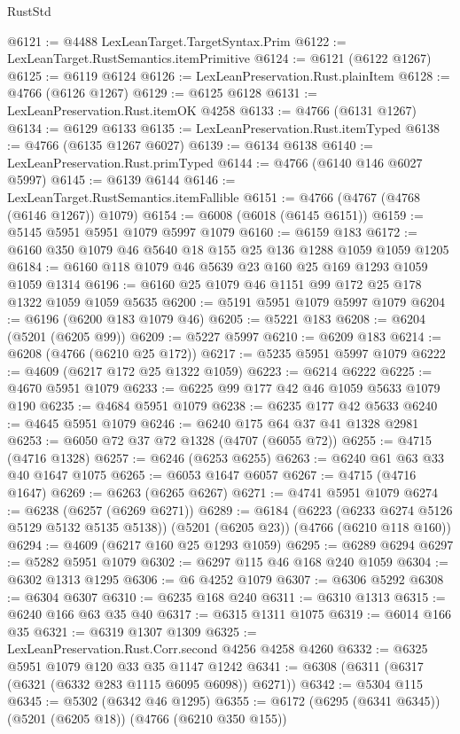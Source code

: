 \begin{lexlean}{RustStd}
\begin{coremodule}
{\begin{coremodule}
{{{{{{{{{{{{{{{{{{{{{{{{{{{{{{{{{{{@6121 := @4488 LexLeanTarget.TargetSyntax.Prim
@6122 := LexLeanTarget.RustSemantics.itemPrimitive
@6124 := @6121 (@6122 @1267)
@6125 := @6119 @6124
@6126 := LexLeanPreservation.Rust.plainItem
@6128 := @4766 (@6126 @1267)
@6129 := @6125 @6128
@6131 := LexLeanPreservation.Rust.itemOK @4258
@6133 := @4766 (@6131 @1267)
@6134 := @6129 @6133
@6135 := LexLeanPreservation.Rust.itemTyped
@6138 := @4766 (@6135 @1267 @6027)
@6139 := @6134 @6138
@6140 := LexLeanPreservation.Rust.primTyped
@6144 := @4766 (@6140 @146 @6027 @5997)
@6145 := @6139 @6144
@6146 := LexLeanTarget.RustSemantics.itemFallible
@6151 := @4766 (@4767 (@4768 (@6146 @1267)) @1079)
@6154 := @6008 (@6018 (@6145 @6151))
@6159 := @5145 @5951 @5951 @1079 @5997 @1079
@6160 := @6159 @183
@6172 := @6160 @350 @1079 @46 @5640 @18 @155 @25 @136 @1288 @1059 @1059 @1205
@6184 := @6160 @118 @1079 @46 @5639 @23 @160 @25 @169 @1293 @1059 @1059 @1314
@6196 := @6160 @25 @1079 @46 @1151 @99 @172 @25 @178 @1322 @1059 @1059 @5635
@6200 := @5191 @5951 @1079 @5997 @1079
@6204 := @6196 (@6200 @183 @1079 @46)
@6205 := @5221 @183
@6208 := @6204 (@5201 (@6205 @99))
@6209 := @5227 @5997
@6210 := @6209 @183
@6214 := @6208 (@4766 (@6210 @25 @172))
@6217 := @5235 @5951 @5997 @1079
@6222 := @4609 (@6217 @172 @25 @1322 @1059)
@6223 := @6214 @6222
@6225 := @4670 @5951 @1079
@6233 := @6225 @99 @177 @42 @46 @1059 @5633 @1079 @190
@6235 := @4684 @5951 @1079
@6238 := @6235 @177 @42 @5633
@6240 := @4645 @5951 @1079
@6246 := @6240 @175 @64 @37 @41 @1328 @2981
@6253 := @6050 @72 @37 @72 @1328 (@4707 (@6055 @72))
@6255 := @4715 (@4716 @1328)
@6257 := @6246 (@6253 @6255)
@6263 := @6240 @61 @63 @33 @40 @1647 @1075
@6265 := @6053 @1647 @6057
@6267 := @4715 (@4716 @1647)
@6269 := @6263 (@6265 @6267)
@6271 := @4741 @5951 @1079
@6274 := @6238 (@6257 (@6269 @6271))
@6289 := @6184
    (@6223 (@6233 @6274 @5126 @5129 @5132 @5135 @5138))
    (@5201 (@6205 @23))
    (@4766 (@6210 @118 @160))
@6294 := @4609 (@6217 @160 @25 @1293 @1059)
@6295 := @6289 @6294
@6297 := @5282 @5951 @1079
@6302 := @6297 @115 @46 @168 @240 @1059
@6304 := @6302 @1313 @1295
@6306 := @6 @4252 @1079
@6307 := @6306 @5292
@6308 := @6304 @6307
@6310 := @6235 @168 @240
@6311 := @6310 @1313
@6315 := @6240 @166 @63 @35 @40
@6317 := @6315 @1311 @1075
@6319 := @6014 @166 @35
@6321 := @6319 @1307 @1309
@6325 := LexLeanPreservation.Rust.Corr.second @4256 @4258 @4260
@6332 := @6325 @5951 @1079 @120 @33 @35 @1147 @1242
@6341 := @6308 (@6311 (@6317 (@6321 (@6332 @283 @1115 @6095 @6098)) @6271))
@6342 := @5304 @115
@6345 := @5302 (@6342 @46 @1295)
@6355 := @6172 (@6295 (@6341 @6345)) (@5201 (@6205 @18)) (@4766 (@6210 @350 @155))
}}}}}}}}}}}}}}}}}}}}}}}}}}}}}}}}}}}
\end{coremodule}}
\end{coremodule}
\end{lexlean}

